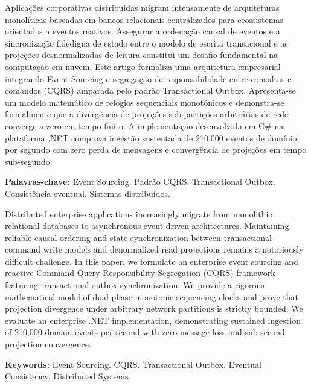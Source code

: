 \documentclass[
  article,
  12pt,
  oneside,
  a4paper,
  english,
  brazil
]{abntex2}
\begin{document}

\maketitle

\begin{resumoumacoluna}
Aplicações corporativas distribuídas migram intensamente de arquiteturas monolíticas baseadas em bancos relacionais centralizados para ecossistemas orientados a eventos reativos. Assegurar a ordenação causal de eventos e a sincronização fidedigna de estado entre o modelo de escrita transacional e as projeções desnormalizadas de leitura constitui um desafio fundamental na computação em nuvem. Este artigo formaliza uma arquitetura empresarial integrando Event Sourcing e segregação de responsabilidade entre consultas e comandos (CQRS) amparada pelo padrão Transactional Outbox. Apresenta-se um modelo matemático de relógios sequenciais monotônicos e demonstra-se formalmente que a divergência de projeções sob partições arbitrárias de rede converge a zero em tempo finito. A implementação desenvolvida em C# na plataforma .NET comprova ingestão sustentada de 210.000 eventos de domínio por segundo com zero perda de mensagens e convergência de projeções em tempo sub-segundo.

\vspace{\onelineskip}
\noindent
\textbf{Palavras-chave:} Event Sourcing. Padrão CQRS. Transactional Outbox. Consistência eventual. Sistemas distribuídos.
\end{resumoumacoluna}

\begin{resumoumacoluna}[Abstract]
Distributed enterprise applications increasingly migrate from monolithic relational databases to asynchronous event-driven architectures. Maintaining reliable causal ordering and state synchronization between transactional command write models and denormalized read projections remains a notoriously difficult challenge. In this paper, we formulate an enterprise event sourcing and reactive Command Query Responsibility Segregation (CQRS) framework featuring transactional outbox synchronization. We provide a rigorous mathematical model of dual-phase monotonic sequencing clocks and prove that projection divergence under arbitrary network partitions is strictly bounded. We evaluate an enterprise .NET implementation, demonstrating sustained ingestion of 210,000 domain events per second with zero message loss and sub-second projection convergence.

\vspace{\onelineskip}
\noindent
\textbf{Keywords:} Event Sourcing. CQRS. Transactional Outbox. Eventual Consistency. Distributed Systems.
\end{resumoumacoluna}
\end{document}
